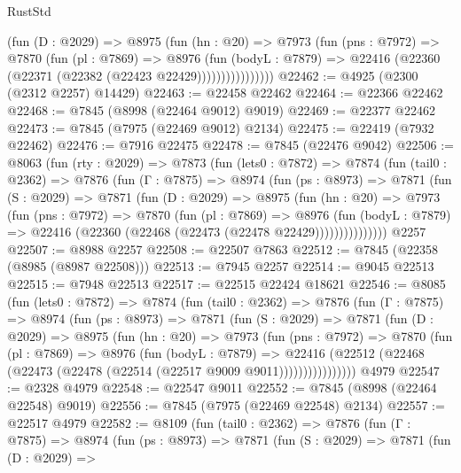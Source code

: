 \begin{lexlean}{RustStd}
\begin{coremodule}
                  (fun (D : @2029) =>
                  @8975
                    (fun (hn : @20) =>
                    @7973
                      (fun (pns : @7972) =>
                      @7870
                        (fun (pl : @7869) =>
                        @8976
                          (fun (bodyL : @7879) =>
                          @22416 (@22360 (@22371 (@22382 (@22423 @22429))))))))))))))))
@22462 := @4925 (@2300 (@2312 @2257) @14429)
@22463 := @22458 @22462
@22464 := @22366 @22462
@22468 := @7845 (@8998 (@22464 @9012) @9019)
@22469 := @22377 @22462
@22473 := @7845 (@7975 (@22469 @9012) @2134)
@22475 := @22419 (@7932 @22462)
@22476 := @7916 @22475
@22478 := @7845 (@22476 @9042)
@22506 := @8063
    (fun (rty : @2029) =>
    @7873
      (fun (lets0 : @7872) =>
      @7874
        (fun (tail0 : @2362) =>
        @7876
          (fun (Γ : @7875) =>
          @8974
            (fun (ps : @8973) =>
            @7871
              (fun (S : @2029) =>
              @7871
                (fun (D : @2029) =>
                @8975
                  (fun (hn : @20) =>
                  @7973
                    (fun (pns : @7972) =>
                    @7870
                      (fun (pl : @7869) =>
                      @8976
                        (fun (bodyL : @7879) =>
                        @22416 (@22360 (@22468 (@22473 (@22478 @22429)))))))))))))))
    @2257
@22507 := @8988 @2257
@22508 := @22507 @7863
@22512 := @7845 (@22358 (@8985 (@8987 @22508)))
@22513 := @7945 @2257
@22514 := @9045 @22513
@22515 := @7948 @22513
@22517 := @22515 @22424 @18621
@22546 := @8085
    (fun (lets0 : @7872) =>
    @7874
      (fun (tail0 : @2362) =>
      @7876
        (fun (Γ : @7875) =>
        @8974
          (fun (ps : @8973) =>
          @7871
            (fun (S : @2029) =>
            @7871
              (fun (D : @2029) =>
              @8975
                (fun (hn : @20) =>
                @7973
                  (fun (pns : @7972) =>
                  @7870
                    (fun (pl : @7869) =>
                    @8976
                      (fun (bodyL : @7879) =>
                      @22416
                        (@22512 (@22468 (@22473 (@22478 (@22514 (@22517 @9009 @9011))))))))))))))))
    @4979
@22547 := @2328 @4979
@22548 := @22547 @9011
@22552 := @7845 (@8998 (@22464 @22548) @9019)
@22556 := @7845 (@7975 (@22469 @22548) @2134)
@22557 := @22517 @4979
@22582 := @8109
    (fun (tail0 : @2362) =>
    @7876
      (fun (Γ : @7875) =>
      @8974
        (fun (ps : @8973) =>
        @7871
          (fun (S : @2029) =>
          @7871
            (fun (D : @2029) =>

\end{coremodule}
\end{lexlean}
